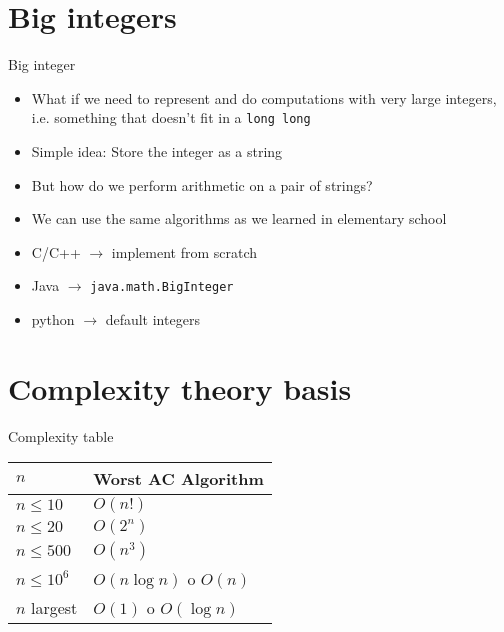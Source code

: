 \documentclass{beamer}
\begin{document}
\section{Big integers}
\begin{frame}{Big integer}
  \begin{itemize}
  \item What if we need to represent and do computations with very large integers,
    i.e. something that doesn't fit in a \texttt{long long}
    \pause
  \item Simple idea: Store the integer as a string
    \pause
  \item But how do we perform arithmetic on a pair of strings?
  \item We can use the same algorithms as we learned in elementary school
    \pause
  \item C/C++ $\to$ implement from scratch
  \item Java $\to$ \texttt{java.math.BigInteger}
  \item python $\to$ default integers
  \end{itemize}
\end{frame}

\section{Complexity theory basis}
\centering
\begin{frame}{Complexity table}
  \begin{table}[]
    \begin{tabular}{ll}
      \toprule
      $n$             & Worst AC Algorithm   \\
      \midrule
      $n \leq 10$   & $O(n!)$                \\
      $n \leq 20$   & $O(2^n)$                \\
      $n \leq 500$  & $O(n^3)$               \\
      $n \leq 10^6$ & $O(n\log{n})$ o $O(n)$ \\
      $n$ largest   & $O(1)$ o $O(\log{n})$  \\
      \bottomrule
    \end{tabular}
  \end{table}
\end{frame}
\end{document}
